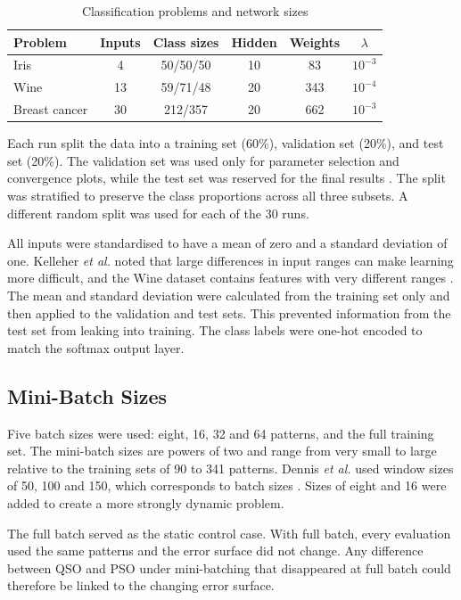 \documentclass[conference]{IEEEtran}
\begin{document}
\begin{table}[t]
\centering
\caption{Classification problems and network sizes}
\label{tab:data}
\small
\setlength{\tabcolsep}{3pt}
\begin{tabular}{lccccc}
\toprule
Problem & Inputs & Class sizes & Hidden & Weights & $\lambda$ \\
\midrule
Iris          & 4  & 50/50/50 & 10 & 83  & $10^{-3}$ \\
Wine          & 13 & 59/71/48 & 20 & 343 & $10^{-4}$ \\
Breast cancer & 30 & 212/357  & 20 & 662 & $10^{-3}$ \\
\bottomrule
\end{tabular}
\end{table}

Each run split the data into a training set (60\%), validation set (20\%), and 
test set (20\%). The validation set was used only for parameter selection and 
convergence plots, while the test set was reserved for the final 
results \cite{kelleher2015}. The split was stratified to preserve the class 
proportions across all three subsets. A different random split was used for 
each of the 30 runs.

All inputs were standardised to have a mean of zero and a standard deviation
of one. Kelleher \textit{et al.} noted that large differences in input 
ranges can make learning more difficult, and the Wine dataset contains 
features with very different ranges \cite{kelleher2015}. The mean and 
standard deviation were calculated from the training set only and then 
applied to the validation and test sets. This prevented information from the 
test set from leaking into training. The class labels were one-hot encoded to 
match the softmax output layer.

\subsection{Mini-Batch Sizes}
Five batch sizes were used: eight, 16, 32 and 64 patterns, and the
full training set. The mini-batch sizes are powers of two and range
from very small to large relative to the training sets of 90 to 341
patterns. Dennis \textit{et al.} used window sizes of 50, 100 and 150, which 
corresponds to batch sizes \cite{dennis2021}. 
Sizes of eight and 16 were added to create a more
strongly dynamic problem.

The full batch served as the static control case. With full batch,
every evaluation used the same patterns and the error surface did not
change. Any difference between QSO and PSO under mini-batching that
disappeared at full batch could therefore be linked to the changing
error surface.
\end{document}
